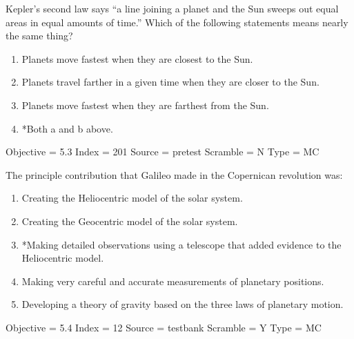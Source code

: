 \documentclass[11pt]{article}
\begin{document}
\begin{enumerate}
\begin{minipage}{\textwidth}
\begin{minipage}{\textwidth}
\item Kepler’s second law says ``a line joining a planet and the Sun sweeps out equal areas in equal amounts of time.'' Which of the following statements means nearly the same thing?
\begin{enumerate} 
\setlength{\itemsep}{1pt} 
\setlength{\parskip}{0pt} 
\setlength{\parsep}{0pt}
\setlength{\multicolsep}{1pt} 
\item 	Planets move fastest when they are closest to the Sun.
\item Planets travel farther in a given time when they are closer to the Sun.
\item Planets move fastest when they are farthest from the Sun.
\item *Both a and b above.
\end{enumerate} 
Objective = 5.3
Index = 201
Source = pretest
Scramble = N
Type = MC
\end{minipage}
\end{minipage}
\vskip 0.20in

\begin{minipage}{\textwidth}
\begin{minipage}{\textwidth}
\item The principle contribution that Galileo made in the Copernican revolution was:
\begin{enumerate} 
\setlength{\itemsep}{1pt} 
\setlength{\parskip}{0pt} 
\setlength{\parsep}{0pt}
\setlength{\multicolsep}{1pt} 
\item Creating the Heliocentric model of the solar system.
\item Creating the Geocentric model of the solar system.
\item *Making detailed observations using a telescope that added evidence to the Heliocentric model.
\item Making very careful and accurate measurements of planetary positions.
\item Developing a theory of gravity based on the three laws of planetary motion.
\end{enumerate} 
Objective = 5.4
Index = 12
Source = testbank
Scramble = Y
Type = MC
\end{minipage}
\end{minipage}
\vskip 0.20in


\end{enumerate}
\end{document}

